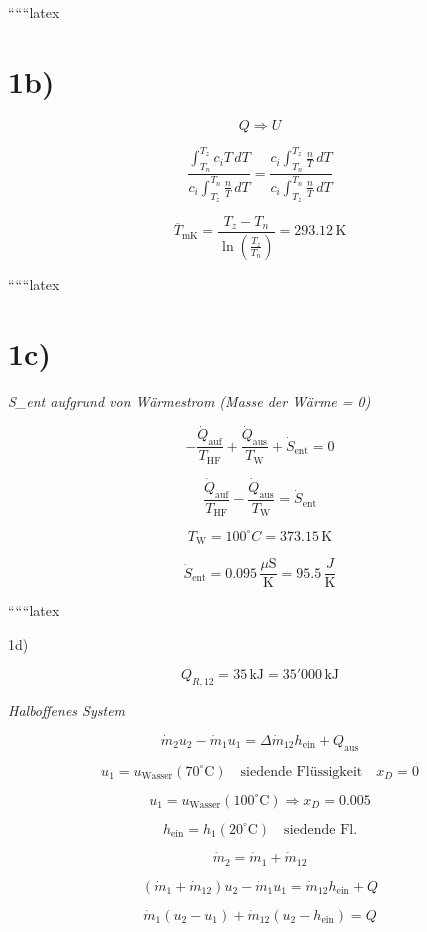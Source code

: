 ``````latex

\section*{1b)}

\[ Q \Rightarrow U \]

\[
\frac{\int_{T_n}^{T_z} c_i T \, dT}{c_i \int_{T_z}^{T_n} \frac{n}{T} \, dT} = \frac{c_i \int_{T_n}^{T_z} \frac{n}{T} \, dT}{c_i \int_{T_z}^{T_n} \frac{n}{T} \, dT}
\]

\[
\overline{T}_{\text{mK}} = \frac{T_z - T_n}{\ln \left( \frac{T_z}{T_n} \right)} = 293.12 \, \text{K}
\]

``````latex


\section*{1c)}

\textit{S\_ent aufgrund von Wärmestrom (Masse der Wärme = 0)}

\[
-\frac{\dot{Q}_{\text{auf}}}{T_{\text{HF}}} + \frac{\dot{Q}_{\text{aus}}}{T_{\text{W}}} + \dot{S}_{\text{ent}} = 0
\]

\[
\frac{\dot{Q}_{\text{auf}}}{T_{\text{HF}}} - \frac{\dot{Q}_{\text{aus}}}{T_{\text{W}}} = \dot{S}_{\text{ent}}
\]

\[
T_{\text{W}} = 100^\circ C = 373.15 \, \text{K}
\]

\[
\dot{S}_{\text{ent}} = 0.095 \, \frac{\mu \text{S}}{\text{K}} = 95.5 \, \frac{J}{\text{K}}
\]

``````latex


1d)

\[
Q_{R,12} = 35 \, \text{kJ} = 35'000 \, \text{kJ}
\]

\textit{Halboffenes System}

\[
\dot{m}_2 u_2 - \dot{m}_1 u_1 = \Delta \dot{m}_{12} h_{\text{ein}} + Q_{\text{aus}}
\]

\[
u_1 = u_{\text{Wasser}} (70^\circ \text{C}) \quad \text{siedende Flüssigkeit} \quad x_D = 0
\]

\[
u_1 = u_{\text{Wasser}} (100^\circ \text{C}) \Rightarrow x_D = 0.005
\]

\[
h_{\text{ein}} = h_1 (20^\circ \text{C}) \quad \text{siedende Fl.}
\]

\[
\dot{m}_2 = \dot{m}_1 + \dot{m}_{12}
\]

\[
(\dot{m}_1 + \dot{m}_{12}) u_2 - \dot{m}_1 u_1 = \dot{m}_{12} h_{\text{ein}} + Q
\]

\[
\dot{m}_1 (u_2 - u_1) + \dot{m}_{12} (u_2 - h_{\text{ein}}) = Q
\]

